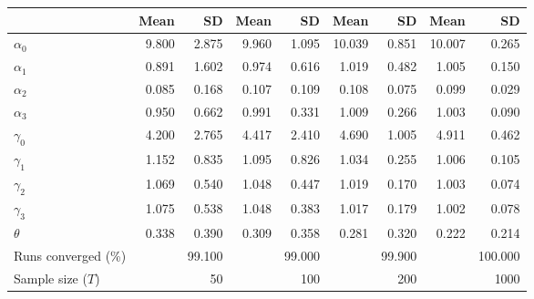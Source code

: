 
\begin{tabular}[t]{lrrrrrrrr}
\toprule
  & Mean & SD & Mean  & SD  & Mean   & SD   & Mean    & SD   \\
\midrule
$\alpha_{0}$ & 9.800 & 2.875 & 9.960 & 1.095 & 10.039 & 0.851 & 10.007 & 0.265\\
$\alpha_{1}$ & 0.891 & 1.602 & 0.974 & 0.616 & 1.019 & 0.482 & 1.005 & 0.150\\
$\alpha_{2}$ & 0.085 & 0.168 & 0.107 & 0.109 & 0.108 & 0.075 & 0.099 & 0.029\\
$\alpha_{3}$ & 0.950 & 0.662 & 0.991 & 0.331 & 1.009 & 0.266 & 1.003 & 0.090\\
$\gamma_{0}$ & 4.200 & 2.765 & 4.417 & 2.410 & 4.690 & 1.005 & 4.911 & 0.462\\
$\gamma_{1}$ & 1.152 & 0.835 & 1.095 & 0.826 & 1.034 & 0.255 & 1.006 & 0.105\\
$\gamma_{2}$ & 1.069 & 0.540 & 1.048 & 0.447 & 1.019 & 0.170 & 1.003 & 0.074\\
$\gamma_{3}$ & 1.075 & 0.538 & 1.048 & 0.383 & 1.017 & 0.179 & 1.002 & 0.078\\
$\theta$ & 0.338 & 0.390 & 0.309 & 0.358 & 0.281 & 0.320 & 0.222 & 0.214\\
Runs converged (\%) &  & 99.100 &  & 99.000 &  & 99.900 &  & 100.000\\
Sample size ($T$) &  & 50 &  & 100 &  & 200 &  & 1000\\
\bottomrule
\end{tabular}
